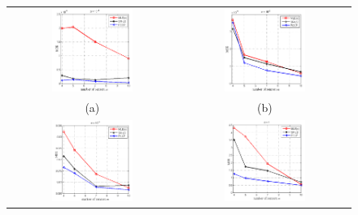 
\begin{figure}[t]
\centering
\begin{tabular}{cc}
 \includegraphics[width=0.5\textwidth,height =0.45\textheight]{figures/ccp/MSE_1e3_sensors}
 &
  \includegraphics[width=0.5\textwidth,height =0.45\textheight]{figures/ccp/MSE_1e2_sensors} 
  \\   (a)&  (b)   \\
 \includegraphics[width=0.5\textwidth,height =0.45\textheight]{figures/ccp/MSE_1e1_sensors}
&
  \includegraphics[width=0.5\textwidth,height =0.45\textheight]{figures/ccp/MSE_1e0_sensors} 

\end{tabular}
\end{figure}
